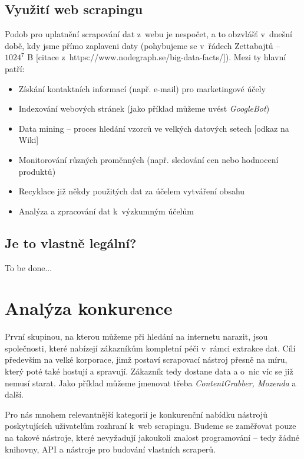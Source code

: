\documentclass[thesis=B,czech]{FITthesis}[2012/06/26]
\begin{document}
\subsection{Využití web scrapingu}
Podob pro uplatnění scrapování dat z~webu je nespočet, a to obzvlášť v~dnešní době, kdy jsme přímo zaplaveni daty (pohybujeme se v~řádech Zettabajtů -- $1024^{7}$ B [citace z~https://www.nodegraph.se/big-data-facts/]). Mezi ty hlavní patří:
\begin{itemize}
	\item Získání kontaktních informací (např. e-mail) pro marketingové účely
	\item Indexování webových stránek (jako příklad můžeme uvést \emph{GoogleBot})
	\item Data mining -- proces hledání vzorců ve velkých datových setech [odkaz na Wiki]
	\item Monitorování různých proměnných (např. sledování cen nebo hodnocení produktů)
	\item Recyklace již někdy použitých dat za účelem vytváření  obsahu
	\item Analýza a zpracování dat k~výzkumným účelům
\end{itemize}

\subsection{Je to vlastně legální?}
To be done...


\newpage
\section{Analýza konkurence}
První skupinou, na kterou můžeme při hledání na internetu narazit, jsou společnosti, které nabízejí zákazníkům kompletní péči v~rámci extrakce dat. Cílí především na velké korporace, jimž postaví scrapovací nástroj přesně na míru, který poté také hostují a spravují. Zákazník tedy dostane data a o~nic víc se již nemusí starat. Jako příklad můžeme jmenovat třeba \emph{ContentGrabber, Mozenda} a další.

Pro nás mnohem relevantnější kategorií je konkurenční nabídku nástrojů poskytujících uživatelům rozhraní k~web scrapingu. Budeme se zaměřovat pouze na takové nástroje, které nevyžadují jakoukoli znalost programování -- tedy žádné knihovny, API a nástroje pro budování vlastních scraperů.
\end{document}
